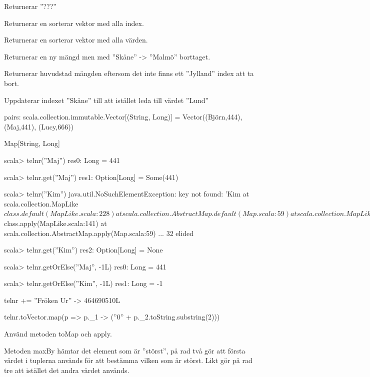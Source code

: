 \Subtask 
Returnerar ''???''

\Subtask 
Returnerar en sorterar vektor med alla index.

\Subtask 
Returnerar en sorterar vektor med alla värden.

\Subtask 
Returnerar en ny mängd men med ''Skåne'' -> ''Malmö'' borttaget. 

\Subtask 
Returnerar huvudstad mängden eftersom det inte finns ett ''Jylland'' index att ta bort.

\Subtask 
Uppdaterar indexet ''Skåne'' till att istället leda till värdet ''Lund''

\Task %

\Subtask 
\begin{REPLnonum} 
pairs: scala.collection.immutable.Vector[(String, Long)] = 
					Vector((Björn,444), (Maj,441), (Lucy,666))
\end{REPLnonum}

\Subtask 
Map[String, Long]

\Subtask 
\begin{REPLnonum}
scala> telnr(''Maj'')
res0: Long = 441

scala> telnr.get(''Maj'')
res1: Option[Long] = Some(441)

scala> telnr(''Kim'')
java.util.NoSuchElementException: key not found: 'Kim
  at scala.collection.MapLike$class.default(MapLike.scala:228)
  at scala.collection.AbstractMap.default(Map.scala:59)
  at scala.collection.MapLike$class.apply(MapLike.scala:141)
  at scala.collection.AbstractMap.apply(Map.scala:59)
  ... 32 elided

scala> telnr.get(''Kim'')
res2: Option[Long] = None
\end{REPLnonum}

\Subtask 
\begin{REPLnonum} 
scala> telnr.getOrElse(''Maj'', -1L)
res0: Long = 441

scala> telnr.getOrElse(''Kim'', -1L)
res1: Long = -1
\end{REPLnonum} 

\Subtask 
telnr += ''Fröken Ur'' -> 464690510L

\Subtask 
telnr.toVector.map(p => p.\_1 -> (''0'' + p.\_2.toString.substring(2)))

\Subtask 
Använd metoden toMap och apply.



\Task %

\Subtask  Metoden maxBy hämtar det element som är ''störst'', på rad två gör  att första värdet i tuplerna används för att bestämma vilken som är störst. Likt gör  på rad tre att istället det andra värdet används.


